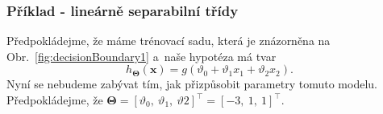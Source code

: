 \newpage

\subsubsection*{Příklad - lineárně separabilní třídy}
\par{Předpokládejme, že máme trénovací sadu, která je znázorněna na Obr.~\ref{fig:decisionBoundary1} a~naše hypotéza má tvar
\begin{equation}
	h_{\bm{\Theta}} \left( \bm{x} \right) = g \left( \vartheta_0 + \vartheta_1 x_1 + \vartheta_2 x_2 \right).
	\label{eq:linearniHypotezaRovnice}
\end{equation}
Nyní se nebudeme zabývat tím, jak přizpůsobit parametry tomuto modelu. Předpokládejme, že $\bm{\Theta} = \left[ \vartheta_0,~\vartheta_1,~\vartheta2 \right]^{\top} = \left[ -3,~1,~1 \right]^{\top}$.}
